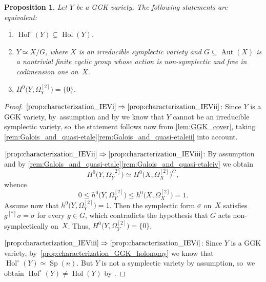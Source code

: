 \documentclass[10pt]{amsart}
\newcommand{\skpt}{\par\smallskip\noindent}
\theoremstyle{plain}
\newtheorem{prop}[thm]{Proposition}
\theoremstyle{definition}
\DeclareMathOperator{\Aut}{Aut}
\DeclareMathOperator{\Hol}{Hol}
\DeclareMathOperator{\Sp}{Sp}
\begin{document}
\begin{prop}
\label{prop:characterization_IEV}
Let $Y$ be a GGK variety. The following statements are equivalent:
\begin{enumerate}
\item\label{prop:characterization_IEVi}
$\Hol^\circ(Y) \subsetneq \Hol(Y) $.

\item\label{prop:characterization_IEVii}
$Y \simeq X/G$, where $X$ is an irreducible symplectic variety and $G \subseteq \Aut(X)$ is a nontrivial finite cyclic group whose action is non-symplectic and free in codimension one on~$X$.

\item\label{prop:characterization_IEViii}
$ H^0 \bigl(Y,\Omega_Y^{[2]} \bigr) = \{ 0 \}$.
\end{enumerate}
\end{prop}

\skpt
\begin{proof}

$\eqref{prop:characterization_IEVi}\Rightarrow\eqref{prop:characterization_IEVii}$: Since $Y$ is a GGK variety, by~assumption and by \cite[Prop.\,F, (F.4)--(F.6)]{GGK19} we know that $Y$ cannot be an irreducible symplectic variety, so~the statement follows now from \autoref{lem:GGK_cover}, taking \autoref{rem:Galois_and_quasi-etale}\eqref{rem:Galois_and_quasi-etaleii} into account.

$\eqref{prop:characterization_IEVii}\Rightarrow\eqref{prop:characterization_IEViii}$: By assumption and by \autoref{rem:Galois_and_quasi-etale}\eqref{rem:Galois_and_quasi-etaleiv} we obtain
\[
H^0 \bigl(Y,\Omega_Y^{[2]} \bigr) \simeq H^0 \bigl(X,\Omega_X^{[2]} \bigr)^G,
\]
whence
\[
0 \leq h^0 \bigl(Y,\Omega_Y^{[2]} \bigr) \leq h^0 \bigl(X,\Omega_X^{[2]} \bigr) = 1.
\]
Assume now that $h^0 \bigl(Y,\Omega_Y^{[2]} \bigr) = 1$. Then the symplectic form $\sigma$ on~$X$ satisfies $g^{[*]} \sigma = \sigma$ for every $g \in G$, which contradicts the hypothesis that $G$ acts non-symplectically on~$X$. Thus,
$ H^0 \bigl(Y,\Omega_Y^{[2]} \bigr) = \{ 0 \} $.

$\eqref{prop:characterization_IEViii}\Rightarrow\eqref{prop:characterization_IEVi}$: Since $Y$ is a GGK variety, by~\autoref{prop:characterization_GGK_holonomy} we know that $\Hol^\circ(Y) \simeq \Sp(n)$. But $Y$ is not a symplectic variety by assumption, so~we obtain $\Hol^\circ(Y) \neq \Hol(Y)$ by \cite[Prop.\,F, (F.4)--(F.6)]{GGK19}.
\end{proof}
\end{document}
